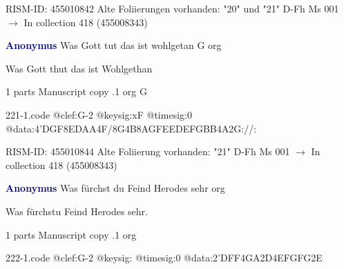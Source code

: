 \documentclass[twocolumn]{book}
\begin{document}
\newline RISM-ID: 455010842
\newline Alte Foliierungen vorhanden: "20" und "21"
\newline D-Fh  Ms 001
\newline $\rightarrow$ In collection 418 (455008343)

\newline \par \vspace{7pt} \textcolor{darkblue}{\textbf{Anonymus  }}
\newline Was Gott tut das ist wohlgetan  G  
\newline org
\newline \begin{itshape} Was Gott thut das ist Wohlgethan\end{itshape} 
\newline \textcolor{darkblue}{}  1 parts  
\newline Manuscript copy
.1  org  G  
\begin{filecontents*}{221-1.code}
@clef:G-2
@keysig:xF
@timesig:0
@data:4'DGF{8ED}{AA}4F/8G4B8A{GFEE}{DEFG}{BB}4A2G://:
\end{filecontents*}
\newline
%

\newline RISM-ID: 455010844
\newline Alte Foliierung vorhanden: "21"
\newline D-Fh  Ms 001
\newline $\rightarrow$ In collection 418 (455008343)

\newline \par \vspace{7pt} \textcolor{darkblue}{\textbf{Anonymus  }}
\newline Was fürchst du Feind Herodes sehr    
\newline org
\newline \begin{itshape}[f.25v, at left:] Was fürchstu Feind Herodes sehr.\end{itshape} 
\newline \textcolor{darkblue}{}  1 parts  
\newline Manuscript copy
.1  org  
\begin{filecontents*}{222-1.code}
@clef:G-2
@keysig:
@timesig:0
@data:2'DFF4GA2D4EFGFG2E
\end{filecontents*}
\newline
%
\end{document}

